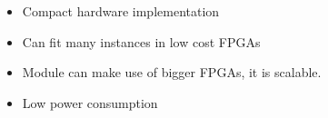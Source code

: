 \begin{itemize}
\item Compact hardware implementation
\item Can fit many instances in low cost FPGAs
\item Module can make use of bigger FPGAs, it is scalable.
\item Low power consumption
\end{itemize}
